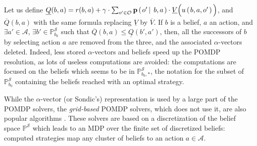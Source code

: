 Let us define $\underline{Q}(b,a) = r(b,a) + \gamma \cdot \sum_{o' \in \mathcal{O}} \textbf{p} \left( \left.  o' \, \right| \left. \, b,a  \right. \right) \cdot \underline{V}\Big( u \left( \left.  b,a,o'  \right. \right) \Big)$,
and $\overline{Q}(b,a)$ with the same formula replacing  $\underline{V}$ by $ \overline{V}$.
If $b$ is a belief, $a$ an action, and 
$\exists a' \in \mathcal{A}$, $\exists b' \in \mathbb{P}^{\mathcal{S}}_{b_0}$ 
such that $\overline{Q}(b,a) \leqslant \underline{Q}(b',a')$,
then, all the successors of $b$ by selecting action $a$ are
removed from the three, and the associated $\alpha$-vectors deleted.
Indeed, less stored $\alpha$-vectors and beliefs speed up the POMDP resolution,
as lots of useless computations are avoided:
the computations are focused on the beliefs which seems to be in $\mathbb{P}^{\mathcal{S}}_{b_0,*}$,
the notation for the subset of $\mathbb{P}^{\mathcal{S}}_{b_0}$
containing the beliefs reached with an optimal strategy.

While the $\alpha$-vector (or Sondic's) representation is used by a large part
of the POMDP solvers, the \textit{grid-based} POMDP solvers, which does not use it, 
are also popular algorithms \cite{bonet:icml02,Lovejoy91,Brafman97aheuristic,Bonet_newgrid-based}.
These solvers are based on a discretization of the belief space $\mathbb{P}^{\mathcal{S}}$
which leads to an MDP over the finite set of discretized beliefs: 
computed strategies map any cluster of beliefs to an action $a \in \mathcal{A}$.

